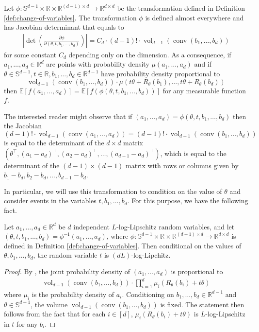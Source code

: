 \documentclass{article}\usepackage[a4paper,margin=20mm]{geometry}
\newcommand{\R}{\mathbb R}
\newcommand{\E}{\mathbb E}
\newcommand{\sfe}{\mathbb{S}^{d-1}}
\newcommand{\conv}{\operatorname{conv}}
\newcommand{\vol}{\operatorname{vol}}
\begin{document}
\begin{lemma}\label{lem:smooth-jacobian}
    Let $\phi: \sfe \times \R \times \R^{(d-1) \times d} \to \R^ {d \times d}$ be the transformation defined in Definition \ref{def:change-of-variables}.
    The transformation $\phi$ is defined almost everywhere and has Jacobian determinant that equals to
    \begin{align*}
        \left| \det\left(\frac{\partial \phi}{\partial (\theta,t,b_1,\dots,b_d)}\right)\right| = C_d \cdot (d-1)! \cdot \vol_{d-1}(\conv(b_1,\ldots,b_d))
    \end{align*}
    for some constant $C_d$ depending only on the dimension.
    As a consequence, if $a_1,\dots,a_d \in \R^d$ are points with probability density $\mu(a_1,\dots,a_d)$
    and if $\theta \in \sfe, t \in \R, b_1,\dots,b_d \in \R^{d-1}$ have probability density proportional to
    \[
        \vol_{d-1}(\conv(b_1,\dots,b_d)) \cdot \mu(t\theta + R_\theta(b_1),\dots,t\theta + R_\theta(b_d))
    \]
    then $\E[f(a_1,\dots,a_d)] = \E[f(\phi(\theta,t,b_1,\dots,b_d))]$ for any measurable function $f$.
\end{lemma}
The interested reader might observe that if $(a_1,\dots,a_d)=\phi(\theta,t,b_1,\dots,b_d)$ then the Jacobian
\[(d-1)! \cdot \vol_{d-1}(\conv(a_1,\ldots,a_d)) = (d-1)! \cdot \vol_{d-1}(\conv(b_1,\ldots,b_d))\]
is equal to the determinant of the $d \times d$ matrix $(\theta^\top, (a_1-a_d)^\top,(a_2-a_d)^\top,\dots,(a_{d-1}-a_d)^\top)$,
which is equal to the determinant of the $(d-1) \times (d-1)$ matrix with rows or columns given by
$b_1-b_d,b_2-b_d,\dots,b_{d-1}-b_d$.

In particular, we will use this transformation to condition on the value of $\theta$
and consider events in the variables $t,b_1,\dots,b_d$. For this purpose, we have the following fact.
\begin{lemma}\label{fact:joint-t-log-lipschitz}
    Let $a_1, \ldots, a_d \in \R^d$ be $d$ independent $L$-log-Lipschitz random variables,
    and let $(\theta, t, b_1,\dots,b_d) = \phi^{-1}(a_1,\dots,a_d)$, where $\phi: \sfe \times \R \times \R^{(d-1) \times d} \to \R^ {d \times d}$ is defined in Definition \ref{def:change-of-variables}.
    Then conditional on the values of $\theta, b_1,\dots,b_d$, the random variable $t$ is $(dL)$-log-Lipchitz.
\end{lemma}
\begin{proof}
    By , the joint probability density of $(a_1, \ldots, a_d)$ is proportional to
    \begin{align*}
        \vol_{d-1}(\conv(b_1, \ldots, b_d)) \cdot \prod_{i=1}^d \mu_i(R_{\theta}(b_i) + t\theta)
    \end{align*}
    where $\mu_i$ is the probability density of $a_i$.
    Conditioning on $b_1,\dots,b_d \in \R^{d-1}$ and $\theta \in \mathbb{S}^{d-1}$, the volume $\vol_{d-1}(\conv(b_1, \ldots, b_d))$ is fixed. 
    The statement then follows from the fact that for each $i \in [d]$, $\mu_i(R_{\theta}(b_i) + t\theta)$
    is $L$-log-Lipschitz in $t$ for any $b_i$.
\end{proof}
\end{document}
